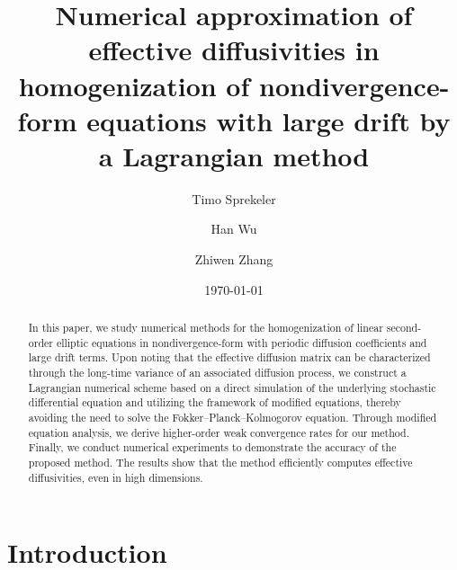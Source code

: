 \documentclass[12pt,a4paper,reqno]{amsart}
\numberwithin{equation}{section}
\begin{document}
\title[Numerical approximation of effective diffusivities]{Numerical approximation of effective diffusivities in homogenization of nondivergence-form equations with large drift by a Lagrangian method}

\author[T. Sprekeler]{Timo Sprekeler}
\address{Department of Mathematics, Texas A{\&}M University, College Station, TX 77843, USA.}

\author[H. Wu]{Han Wu}
\address{The University of Hong Kong, Department of Mathematics, Pokfulam Road, Hong Kong, China.}

\author[Z. Zhang]{Zhiwen Zhang}
\address{The University of Hong Kong, Department of Mathematics, Pokfulam Road, Hong Kong, China.}

\date{\today}

\begin{abstract}
    In this paper, we study numerical methods for the homogenization of linear second-order elliptic equations in nondivergence-form with periodic diffusion coefficients and large drift terms. Upon noting that the effective diffusion matrix can be characterized through the long-time variance of an associated diffusion process, we construct a Lagrangian numerical scheme based on a direct simulation of the underlying stochastic differential equation and utilizing the framework of modified equations, thereby avoiding the need to solve the Fokker--Planck--Kolmogorov equation. Through modified equation analysis, we derive higher-order weak convergence rates for our method. Finally, we conduct numerical experiments to demonstrate the accuracy of the proposed method. The results show that the method efficiently computes effective diffusivities, even in high dimensions.
\end{abstract}

\maketitle

\section{Introduction}
\end{document}
